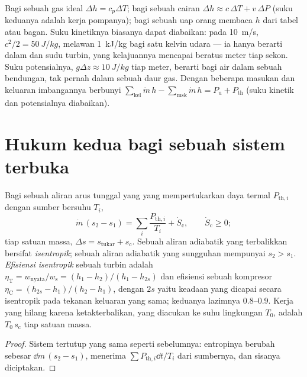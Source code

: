 \begin{remark}\label{rem:b2:open-systems:using}
Bagi sebuah gas ideal $\Delta h = c_p\Delta T$; bagi sebuah cairan $\Delta h \approx
c\,\Delta T + v\,\Delta P$ (suku keduanya adalah kerja pompanya); bagi sebuah uap
orang membaca $h$ dari tabel atau bagan. Suku kinetiknya biasanya
dapat diabaikan: pada \qty{10}{m/s}, $c^2/2 = \qty{50}{J/kg}$, melawan
\qty{1}{kJ/kg} bagi satu kelvin udara --- ia hanya berarti dalam  dan
sudu turbin, yang kelajuannya mencapai beratus meter tiap sekon. Suku
potensialnya, $g\Delta z \approx \qty{10}{J/kg}$ tiap meter, berarti bagi
air dalam sebuah bendungan, tak pernah dalam sebuah daur gas. Dengan beberapa masukan dan keluaran
imbangannya berbunyi $\sum_{\text{kel}}\dot m\,h - \sum_{\text{msk}}\dot m\,h =
P_{\text{u}} + P_{\text{th}}$ (suku kinetik dan potensialnya diabaikan).
\end{remark}

\section{Hukum kedua bagi sebuah sistem terbuka}

\begin{theorem}\label{thm:b2:open-systems:secondlaw}
Bagi sebuah aliran arus tunggal yang  yang mempertukarkan daya termal
$P_{\text{th},i}$ dengan sumber bersuhu $T_i$,
\[
\dot m\,(s_2 - s_1) = \sum_i\frac{P_{\text{th},i}}{T_i} + \dot S_{\text{c}},
\qquad \dot S_{\text{c}} \ge 0 ;
\]
tiap satuan massa, $\Delta s = s_{\text{tukar}} + s_{\text{c}}$. Sebuah aliran
adiabatik yang terbalikkan bersifat \emph{isentropik}; sebuah aliran adiabatik yang sungguhan mempunyai $s_2 >
s_1$. \emph{Efisiensi isentropik} sebuah
turbin adalah $\eta_{\text{T}} = w_{\text{nyata}}/w_{\text{s}} = (h_1 - h_2)/(h_1
- h_{2s})$ dan efisiensi sebuah kompresor $\eta_{\text{C}} = (h_{2s} - h_1)/(h_2 -
h_1)$, dengan $2s$ yaitu keadaan yang dicapai secara isentropik pada tekanan
keluaran yang sama; keduanya lazimnya $0.8$--$0.9$. Kerja yang hilang karena
ketakterbalikan, yang diacukan ke suhu lingkungan $T_0$, adalah
$T_0\,s_{\text{c}}$ tiap satuan massa.
\end{theorem}

\begin{proof}
Sistem tertutup yang sama seperti sebelumnya: entropinya berubah sebesar $\dd m\,(s_2 -
s_1)$, menerima $\sum P_{\text{th},i}\dd t/T_i$ dari sumbernya, dan
sisanya diciptakan.
\end{proof}


